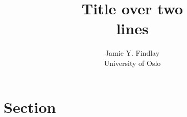 \documentclass[
11pt,
draft,
a4paper
]{article}
\title{Title over two \\ lines}
\author{Jamie Y. Findlay\\\small University of Oslo\\\small\email{jamie.findlay@iln.uio.no}}
\date{}
\begin{document}
\maketitle

\section{Section}

\lipsum
\end{document}
